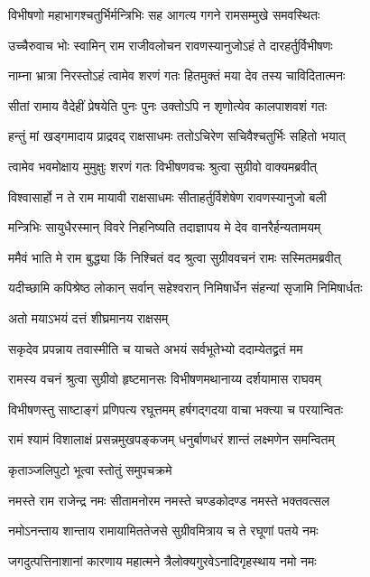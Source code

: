 \twolineshloka
{विभीषणो महाभागश्चतुर्भिर्मन्त्रिभिः सह}
{आगत्य गगने रामसम्मुखे समवस्थितः} %

\twolineshloka
{उच्चैरुवाच भोः स्वामिन् राम राजीवलोचन}
{रावणस्यानुजोऽहं ते दारहर्तुर्विभीषणः} %

\twolineshloka
{नाम्ना भ्रात्रा निरस्तोऽहं त्वामेव शरणं गतः}
{हितमुक्तं मया देव तस्य चाविदितात्मनः} %

\twolineshloka
{सीतां रामाय वैदेहीं प्रेषयेति पुनः पुनः}
{उक्तोऽपि न शृणोत्येव कालपाशवशं गतः} %

\twolineshloka
{हन्तुं मां खड्गमादाय प्राद्रवद् राक्षसाधमः}
{ततोऽचिरेण सचिवैश्चतुर्भिः सहितो भयात्} %

\twolineshloka
{त्वामेव भवमोक्षाय मुमुक्षुः शरणं गतः}
{विभीषणवचः श्रुत्वा सुग्रीवो वाक्यमब्रवीत्} %

\twolineshloka
{विश्वासार्हो न ते राम मायावी राक्षसाधमः}
{सीताहर्तुर्विशेषेण रावणस्यानुजो बली} %

\twolineshloka
{मन्त्रिभिः सायुधैरस्मान् विवरे निहनिष्यति}
{तदाज्ञापय मे देव वानरैर्हन्यतामयम्} %

\twolineshloka
{ममैवं भाति मे राम बुद्ध्या किं निश्चितं वद}
{श्रुत्वा सुग्रीववचनं रामः सस्मितमब्रवीत्} %

\twolineshloka
{यदीच्छामि कपिश्रेष्ठ लोकान् सर्वान् सहेश्वरान्}
{निमिषार्धेन संहन्यां सृजामि निमिषार्धतः} %

\onelineshloka
{अतो मयाऽभयं दत्तं शीघ्रमानय राक्षसम्} %

\twolineshloka
{सकृदेव प्रपन्नाय तवास्मीति च याचते}
{अभयं सर्वभूतेभ्यो ददाम्येतद्व्रतं मम} %

\twolineshloka
{रामस्य वचनं श्रुत्वा सुग्रीवो हृष्टमानसः}
{विभीषणमथानाय्य दर्शयामास राघवम्} %

\twolineshloka
{विभीषणस्तु साष्टाङ्गं प्रणिपत्य रघूत्तमम्}
{हर्षगद्गदया वाचा भक्त्या च परयान्वितः} %

\twolineshloka
{रामं श्यामं विशालाक्षं प्रसन्नमुखपङ्कजम्}
{धनुर्बाणधरं शान्तं लक्ष्मणेन समन्वितम्} %

\onelineshloka
{कृताञ्जलिपुटो भूत्वा स्तोतुं समुपचक्रमे} %



\twolineshloka
{नमस्ते राम राजेन्द्र नमः सीतामनोरम}
{नमस्ते चण्डकोदण्ड नमस्ते भक्तवत्सल} %

\twolineshloka
{नमोऽनन्ताय शान्ताय रामायामिततेजसे}
{सुग्रीवमित्राय च ते रघूणां पतये नमः} %

\twolineshloka
{जगदुत्पत्तिनाशानां कारणाय महात्मने}
{त्रैलोक्यगुरवेऽनादिगृहस्थाय नमो नमः} %

